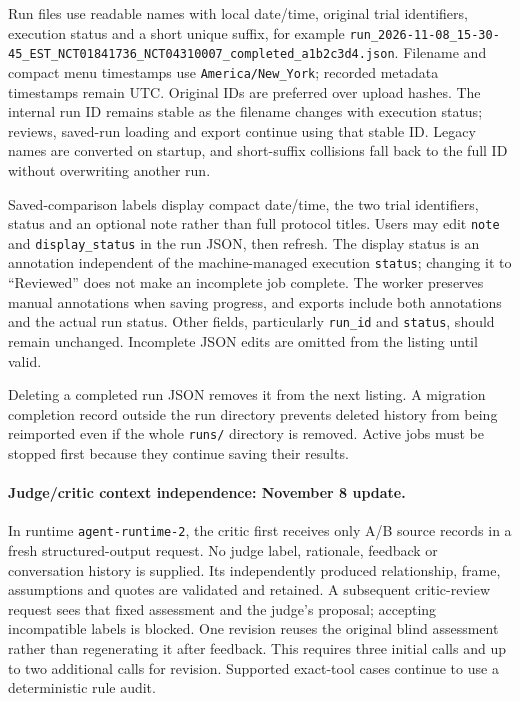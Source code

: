 \documentclass[10pt,letterpaper]{article}
\newcommand{\pathcode}[1]{\nolinkurl{#1}}
\begin{document}
Run files use readable names with local date/time, original trial identifiers,
execution status and a short unique suffix, for example
\pathcode{run_2026-11-08_15-30-45_EST_NCT01841736_NCT04310007_completed_a1b2c3d4.json}.
Filename and compact menu timestamps use \pathcode{America/New_York}; recorded
metadata timestamps remain UTC. Original IDs are preferred over upload hashes.
The internal run ID remains stable as the filename changes with execution
status; reviews, saved-run loading and export continue using that stable ID.
Legacy names are converted on startup, and short-suffix collisions fall back
to the full ID without overwriting another run.

Saved-comparison labels display compact date/time, the two trial identifiers,
status and an optional note rather than full protocol titles. Users may edit
\pathcode{note} and \pathcode{display_status} in the run JSON, then refresh.
The display status is an annotation independent of the machine-managed
execution \pathcode{status}; changing it to ``Reviewed'' does not make an
incomplete job complete. The worker preserves manual annotations when saving
progress, and exports include both annotations and the actual run status.
Other fields, particularly \pathcode{run_id} and \pathcode{status}, should remain
unchanged. Incomplete JSON edits are omitted from the listing until valid.

Deleting a completed run JSON removes it from the next listing. A migration
completion record outside the run directory prevents deleted history from
being reimported even if the whole \pathcode{runs/} directory is removed.
Active jobs must be stopped first because they continue saving their results.

\paragraph{Judge/critic context independence: November 8 update.}
In runtime \pathcode{agent-runtime-2}, the critic first receives only A/B source
records in a fresh structured-output request. No judge label, rationale,
feedback or conversation history is supplied. Its independently produced
relationship, frame, assumptions and quotes are validated and retained. A
subsequent critic-review request sees that fixed assessment and the judge's
proposal; accepting incompatible labels is blocked. One revision reuses the
original blind assessment rather than regenerating it after feedback. This
requires three initial calls and up to two additional calls for revision.
Supported exact-tool cases continue to use a deterministic rule audit.
\end{document}

